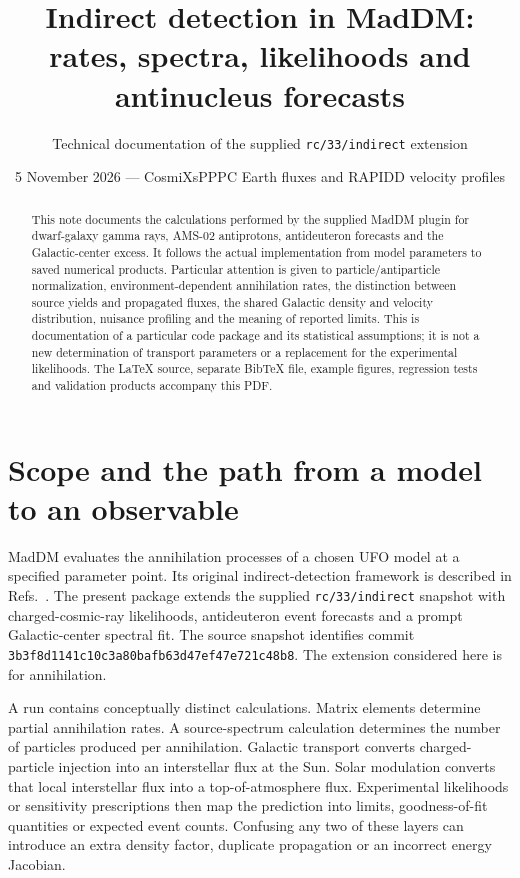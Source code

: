 \documentclass[11pt,a4paper]{article}
\title{Indirect detection in MadDM:\\rates, spectra, likelihoods and antinucleus forecasts}
\author{Technical documentation of the supplied \texttt{rc/33/indirect} extension}
\date{5 November 2026 --- CosmiXsPPPC Earth fluxes and RAPIDD velocity profiles}
\begin{document}
\maketitle
\begin{abstract}
This note documents the calculations performed by the supplied MadDM plugin for dwarf-galaxy gamma rays, AMS-02 antiprotons, antideuteron forecasts and the Galactic-center excess. It follows the actual implementation from model parameters to saved numerical products. Particular attention is given to particle/antiparticle normalization, environment-dependent annihilation rates, the distinction between source yields and propagated fluxes, the shared Galactic density and velocity distribution, nuisance profiling and the meaning of reported limits. This is documentation of a particular code package and its statistical assumptions; it is not a new determination of transport parameters or a replacement for the experimental likelihoods. The LaTeX source, separate BibTeX file, example figures, regression tests and validation products accompany this PDF.
\end{abstract}
\tableofcontents
\clearpage

\section{Scope and the path from a model to an observable}
MadDM evaluates the annihilation processes of a chosen UFO model at a specified parameter point. Its original indirect-detection framework is described in Refs.~\cite{Ambrogi:2018jqj,Arina:2021gfn}. The present package extends the supplied \texttt{rc/33/indirect} snapshot with charged-cosmic-ray likelihoods, antideuteron event forecasts and a prompt Galactic-center spectral fit. The source snapshot identifies commit \texttt{3b3f8d1141c10c3a80bafb63d47ef47e721c48b8}. The extension considered here is for annihilation.

A run contains conceptually distinct calculations. Matrix elements determine partial annihilation rates. A source-spectrum calculation determines the number of particles produced per annihilation. Galactic transport converts charged-particle injection into an interstellar flux at the Sun. Solar modulation converts that local interstellar flux into a top-of-atmosphere flux. Experimental likelihoods or sensitivity prescriptions then map the prediction into limits, goodness-of-fit quantities or expected event counts. Confusing any two of these layers can introduce an extra density factor, duplicate propagation or an incorrect energy Jacobian.
\end{document}
